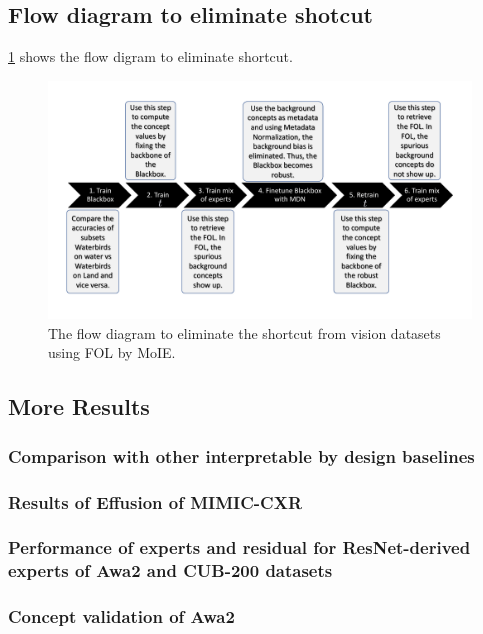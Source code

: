 \documentclass[nohyperref]{article}
\theoremstyle{plain}
\theoremstyle{definition}
\theoremstyle{remark}
\begin{document}
\subsection{Flow diagram to eliminate shotcut}
\label{app:shortcut}
\cref{fig:spurious_flow} shows the flow digram to eliminate shortcut.
\begin{figure}[h]
\centering
\includegraphics[width=1.0\textwidth]
{figures/Supp/Spurious_Flow.pdf}
\caption{The flow diagram to eliminate the shortcut from vision datasets using FOL by MoIE.}
\label{fig:spurious_flow}
\end{figure}


\subsection{More Results}
\subsubsection{Comparison with other interpretable by design baselines}
\label{app:more_baselines}


\subsubsection{Results of Effusion of MIMIC-CXR}
\label{app:mimic_cxr}


\subsubsection{Performance of experts and residual for ResNet-derived experts of Awa2 and CUB-200 datasets}
\label{app:resnet_cv}


\subsubsection{Concept validation of Awa2}
\label{app:awa2}

\end{document}
